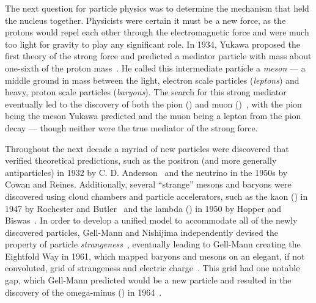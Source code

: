The next question for particle physics was to determine the mechanism that held the nucleus together. Physicists were certain it must be a new force, as the protons would repel each other through the electromagnetic force and were much too light for gravity to play any significant role. In 1934, Yukawa proposed the first theory of the strong force and predicted a mediator particle with mass about one-sixth of the proton mass~\cite{QFTNutshell}. He called this intermediate particle a \textit{meson} --- a middle ground in mass between the light, electron scale particles (\textit{leptons}) and heavy, proton scale particles (\textit{baryons}). The search for this strong mediator eventually led to the discovery of both the pion (\PGp) and muon (\PGm)~\cite{pion_discovery}, with the pion being the meson Yukawa predicted and the muon being a lepton from the pion decay --- though neither were the true mediator of the strong force.

Throughout the next decade a myriad of new particles were discovered that verified theoretical predictions, such as the positron (and more generally antiparticles) in 1932 by C. D. Anderson~\cite{positron_discovery} and the neutrino in the 1950s by Cowan and Reines\cite{neutrino_discovery}. Additionally, several ``strange'' mesons and baryons were discovered using cloud chambers and particle accelerators, such as the kaon (\PKz) in 1947 by Rochester and Butler~\cite{kaon_discovery} and the lambda (\PGL) in 1950 by Hopper and Biswas~\cite{lambda_discovery}. In order to develop a unified model to accommodate all of the newly discovered particles, Gell-Mann and Nishijima independently devised the property of particle \textit{strangeness}~\cite{strangeness_gellmann,strangeness_nishijima}, eventually leading to Gell-Mann creating the Eightfold Way in 1961, which mapped baryons and mesons on an elegant, if not convoluted, grid of strangeness and electric charge~\cite{eightfoldway}. This grid had one notable gap, which Gell-Mann predicted would be a new particle and resulted in the discovery of the omega-minus (\PGOm) in 1964~\cite{omega_discovery}.

